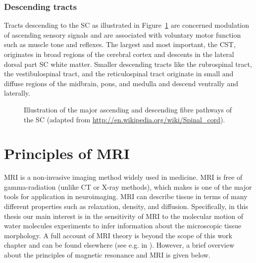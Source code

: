 \subsubsection*{Descending tracts}
\label{sec:chap2:descendingtracts}
Tracts descending to the {\gls{SC}} as illustrated in Figure~\ref{fig:chapter 2 spinal_cord_anatomy} are concerned modulation of ascending sensory signals and are associated with voluntary motor function such as muscle tone and reflexes. The largest and most important, the {\gls{CST}}, originates in broad regions of the cerebral cortex and descents in the lateral dorsal part {\gls{SC}} white matter. Smaller descending tracts like the rubrospinal tract, the vestibulospinal tract, and the reticulospinal tract originate in small and diffuse regions of the midbrain, pons, and medulla and descend ventrally and laterally.
\begin{figure}
 \centering
  \caption{Illustration of the major ascending and descending fibre pathways of the {\protect\gls{SC}} (adapted from \url{http://en.wikipedia.org/wiki/Spinal_cord}).}
  \label{fig:chapter 2 spinal_cord_anatomy}
\end{figure}

\section{Principles of MRI}
\Gls{MRI} is a non-invasive imaging method widely used in medicine. \gls{MRI} is free of gamma-radiation (unlike CT or X-ray methods), which makes is one of the major tools for application in neuroimaging. \Gls{MRI} can describe tissue in terms of many different properties such as relaxation, density, and diffusion. Specifically, in this thesis our main interest is in the sensitivity of MRI to the molecular motion of water molecules experiments to infer information about the microscopic tissue morphology. A full account of MRI theory is beyond the scope of this work chapter and can be found elsewhere (see e.g. in \cite{McRobbie:2002,Bernstein:2004}). However, a brief overview about the principles of magnetic resonance and \gls{MRI} is given below.

